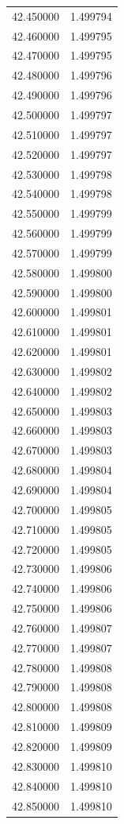 \begin{tabular}{rr}
42.450000 & 1.499794 \\
42.460000 & 1.499795 \\
42.470000 & 1.499795 \\
42.480000 & 1.499796 \\
42.490000 & 1.499796 \\
42.500000 & 1.499797 \\
42.510000 & 1.499797 \\
42.520000 & 1.499797 \\
42.530000 & 1.499798 \\
42.540000 & 1.499798 \\
42.550000 & 1.499799 \\
42.560000 & 1.499799 \\
42.570000 & 1.499799 \\
42.580000 & 1.499800 \\
42.590000 & 1.499800 \\
42.600000 & 1.499801 \\
42.610000 & 1.499801 \\
42.620000 & 1.499801 \\
42.630000 & 1.499802 \\
42.640000 & 1.499802 \\
42.650000 & 1.499803 \\
42.660000 & 1.499803 \\
42.670000 & 1.499803 \\
42.680000 & 1.499804 \\
42.690000 & 1.499804 \\
42.700000 & 1.499805 \\
42.710000 & 1.499805 \\
42.720000 & 1.499805 \\
42.730000 & 1.499806 \\
42.740000 & 1.499806 \\
42.750000 & 1.499806 \\
42.760000 & 1.499807 \\
42.770000 & 1.499807 \\
42.780000 & 1.499808 \\
42.790000 & 1.499808 \\
42.800000 & 1.499808 \\
42.810000 & 1.499809 \\
42.820000 & 1.499809 \\
42.830000 & 1.499810 \\
42.840000 & 1.499810 \\
42.850000 & 1.499810 \\

\end{tabular}
